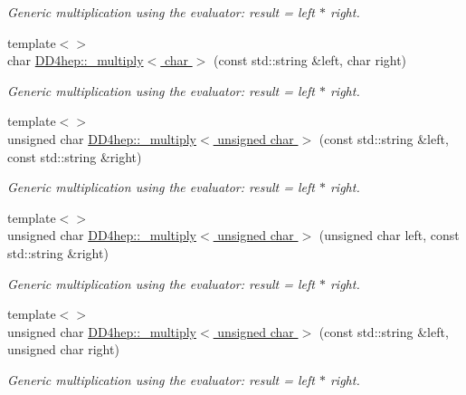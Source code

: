 \begin{DoxyCompactItemize}
\begin{DoxyCompactList}\small\item\em Generic multiplication using the evaluator: result = left $\ast$ right. \item\end{DoxyCompactList}\item 
{\footnotesize template$<$$>$ }\\char \hyperlink{group___d_d4_h_e_p___g_e_o_m_e_t_r_y_ga52998bcba1b4b9f74a9c1abb9bd091ac}{DD4hep::\_\-multiply$<$ char $>$} (const std::string \&left, char right)
\begin{DoxyCompactList}\small\item\em Generic multiplication using the evaluator: result = left $\ast$ right. \item\end{DoxyCompactList}\item 
{\footnotesize template$<$$>$ }\\unsigned char \hyperlink{group___d_d4_h_e_p___g_e_o_m_e_t_r_y_gab0d556cb2dc231ae51cf6ac6d6608be1}{DD4hep::\_\-multiply$<$ unsigned char $>$} (const std::string \&left, const std::string \&right)
\begin{DoxyCompactList}\small\item\em Generic multiplication using the evaluator: result = left $\ast$ right. \item\end{DoxyCompactList}\item 
{\footnotesize template$<$$>$ }\\unsigned char \hyperlink{group___d_d4_h_e_p___g_e_o_m_e_t_r_y_ga4d413f7de335c9fd4445b3001af304d2}{DD4hep::\_\-multiply$<$ unsigned char $>$} (unsigned char left, const std::string \&right)
\begin{DoxyCompactList}\small\item\em Generic multiplication using the evaluator: result = left $\ast$ right. \item\end{DoxyCompactList}\item 
{\footnotesize template$<$$>$ }\\unsigned char \hyperlink{group___d_d4_h_e_p___g_e_o_m_e_t_r_y_ga760735ffda710de230ec1c242034cfca}{DD4hep::\_\-multiply$<$ unsigned char $>$} (const std::string \&left, unsigned char right)
\begin{DoxyCompactList}\small\item\em Generic multiplication using the evaluator: result = left $\ast$ right. \item\end{DoxyCompactList}\item 

\end{DoxyCompactItemize}
